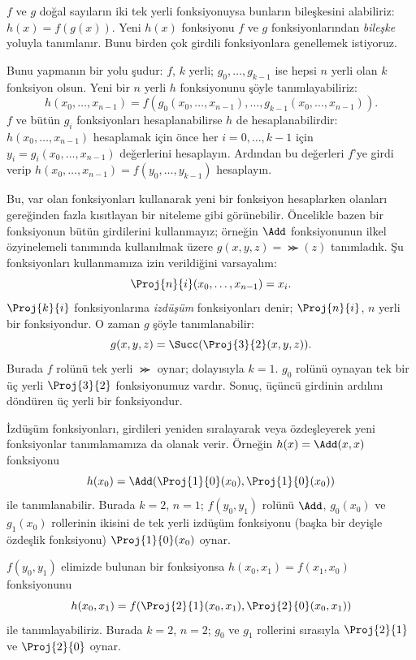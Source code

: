 


$f$ ve $g$ doğal sayıların iki tek yerli fonksiyonuysa bunların
bileşkesini alabiliriz: $h(x)=f(g(x))$. Yeni $h(x)$ fonksiyonu $f$ ve
$g$ fonksiyonlarından \emph{bileşke} yoluyla tanımlanır. Bunu birden
çok girdili fonksiyonlara genellemek istiyoruz.

Bunu yapmanın bir yolu şudur: $f$, $k$ yerli; $g_0,\dots,g_{k-1}$ ise
hepsi $n$ yerli olan $k$ fonksiyon olsun. Yeni bir $n$ yerli $h$
fonksiyonunu şöyle tanımlayabiliriz:
\[
h(x_0, \dots, x_{n-1}) =
f(g_0(x_0, \dots, x_{n-1}), \dots, g_{k-1}(x_0, \dots, x_{n-1})).
\]
$f$ ve bütün $g_i$ fonksiyonları hesaplanabilirse $h$ de
hesaplanabilirdir: $h(x_0,\dots,x_{n-1})$ hesaplamak için önce her
$i=0,\dots,k-1$ için $y_i=g_i(x_0,\dots,x_{n-1})$ değerlerini
hesaplayın. Ardından bu değerleri $f$'ye girdi verip
$h(x_0,\dots,x_{n-1})=f(y_0,\dots,y_{k-1})$ hesaplayın.

Bu, var olan fonksiyonları kullanarak yeni bir fonksiyon hesaplarken
olanları gereğinden fazla kısıtlayan bir niteleme gibi görünebilir.
Öncelikle bazen bir fonksiyonun bütün girdilerini kullanmayız; örneğin
$\Add$ fonksiyonunun ilkel özyinelemeli tanımında kullanılmak üzere
$g(x,y,z)=\Succ(z)$ tanımladık. Şu fonksiyonları kullanmamıza izin
verildiğini varsayalım:
\[
\Proj{n}{i}(x_0, \dots, x_{n-1}) = x_i.
\]
$\Proj{k}{i}$ fonksiyonlarına \emph{izdüşüm} fonksiyonları denir;
$\Proj{n}{i}$, $n$ yerli bir fonksiyondur. O zaman $g$ şöyle
tanımlanabilir:
\[
g(x, y, z) = \Succ(\Proj{3}{2}(x, y, z)).
\]
Burada $f$ rolünü tek yerli $\Succ$ oynar; dolayısıyla $k=1$.
$g_0$ rolünü oynayan tek bir üç yerli $\Proj{3}{2}$ fonksiyonumuz
vardır. Sonuç, üçüncü girdinin ardılını döndüren üç yerli bir
fonksiyondur.

İzdüşüm fonksiyonları, girdileri yeniden sıralayarak veya özdeşleyerek
yeni fonksiyonlar tanımlamamıza da olanak verir. Örneğin
$h(x)=\Add(x,x)$ fonksiyonu
\[
h(x_0)=\Add(\Proj{1}{0}(x_0),\Proj{1}{0}(x_0))
\]
ile tanımlanabilir. Burada $k=2$, $n=1$; $f(y_0,y_1)$ rolünü $\Add$,
$g_0(x_0)$ ve $g_1(x_0)$ rollerinin ikisini de tek yerli izdüşüm
fonksiyonu (başka bir deyişle özdeşlik fonksiyonu)
$\Proj{1}{0}(x_0)$ oynar.

$f(y_0,y_1)$ elimizde bulunan bir fonksiyonsa
$h(x_0,x_1)=f(x_1,x_0)$ fonksiyonunu
\[
h(x_0, x_1) = f(\Proj{2}{1}(x_0, x_1),\Proj{2}{0}(x_0, x_1))
\]
ile tanımlayabiliriz. Burada $k=2$, $n=2$; $g_0$ ve $g_1$ rollerini
sırasıyla $\Proj{2}{1}$ ve $\Proj{2}{0}$ oynar.

